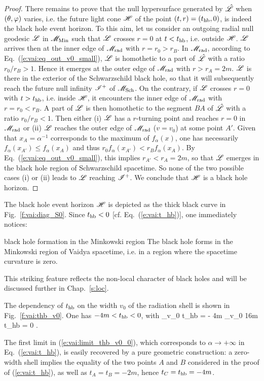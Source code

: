 \begin{proof}
There remains to prove that the null hypersurface generated by
$\hat{\mathscr{L}}$ when $(\theta,\varphi)$ varies, i.e. the future light cone $\mathscr{H}$
of the point $(t, r) = (t_{\rm hb}, 0)$, is indeed the black hole event
horizon. To this aim, let us consider an outgoing radial null geodesic $\mathscr{L}$
in $\mathscr{M}_{\rm Min}$ such that $\mathscr{L}$ crosses $r=0$ at $t < t_{\rm hb}$,
i.e. outside $\mathscr{H}$.
$\mathscr{L}$ arrives then at the inner edge of $\mathscr{M}_{\rm rad}$
with $r = r_0 > r_B$.  In $\mathscr{M}_{\rm rad}$,
according to Eq.~(\ref{e:vai:eq_out_v0_small}),
$\mathscr{L}$ is homothetic to a part of $\hat{\mathscr{L}}$ with a ratio $r_0 / r_B > 1$. Hence it emerges
at the outer edge of $\mathscr{M}_{\rm rad}$ with $r > r_A = 2 m$. $\mathscr{L}$ is
there in the exterior of the Schwarzschild black hole, so that it will subsequently reach
the future null infinity $\mathscr{I}^+$ of $\mathscr{M}_{\rm Sch}$.
On the contrary, if $\mathscr{L}$ crosses $r=0$ with $t > t_{\rm hb}$,
i.e. inside $\mathscr{H}$,
it encounters the inner edge of $\mathscr{M}_{\rm rad}$ with
$r = r_0 < r_B$. A part of $\mathscr{L}$ is then homothetic to the segment $BA$ of
$\hat{\mathscr{L}}$ with a ratio $r_0 / r_B < 1$. Then either (i) $\mathscr{L}$ has a
$r$-turning point and reaches $r=0$
in $\mathscr{M}_{\rm rad}$ or (ii) $\mathscr{L}$ reaches
the outer edge of $\mathscr{M}_{\rm rad}$ ($v = v_0$) at some point $A'$.
Given that $x_A = \alpha^{-1}$ corresponds to the maximum of $f_\alpha(x)$, one
has necessarily $f_\alpha(x_{A'}) \leq f_\alpha(x_A)$ and thus
$r_0 f_\alpha(x_{A'}) < r_B f_\alpha(x_A)$. By
Eq.~(\ref{e:vai:eq_out_v0_small}), this implies $r_{A'} < r_A = 2m$, so
that $\mathscr{L}$ emerges in the black hole region of Schwarzschild spacetime.
So none of the two possible cases (i) or (ii) leads to $\mathscr{L}$ reaching
$\mathscr{I}^+$. We conclude that $\mathscr{H}$ is a black hole
horizon.
\end{proof}

The black hole event horizon $\mathscr{H}$ is depicted as the thick black curve
in Fig.~\ref{f:vai:diag_S0}. Since $t_{\rm hb} < 0$ [cf. Eq.~(\ref{e:vai:t_hb})],
one immediately notices:
\begin{tprop}{black hole formation in the Minkowski region}{}
The black hole forms in the Minkowski
region of Vaidya spacetime, i.e. in a region where the spacetime curvature
is zero.
\end{tprop}
This striking feature reflects the non-local character of black holes and
will be discussed further in Chap.~\ref{s:loc}.

The dependency of $t_{\rm hb}$
on the width $v_0$ of the radiation shell is shown in Fig.~\ref{f:vai:thb_v0}.
One has $-4m < t_{\rm hb} < 0$, with
\be \label{e:vai:limit_thb_v0_0}
    \lim_{v_0 } t_{\rm hb} = - 4m \qand
     \lim_{v_0 \to 16m} t_{\rm hb} = 0 .
\ee
\begin{remark}
The first limit in (\ref{e:vai:limit_thb_v0_0}), which corresponds to $\alpha\to +\infty$ in Eq.~(\ref{e:vai:t_hb}),
is easily recovered by a pure geometric construction: a zero-width
shell implies the equality of the two points $A$ and $B$ considered in the
proof of (\ref{e:vai:t_hb}), as well as $t_A = t_B = - 2m$, hence
$t_C = t_{\rm hb} = - 4 m$.
\end{remark}

